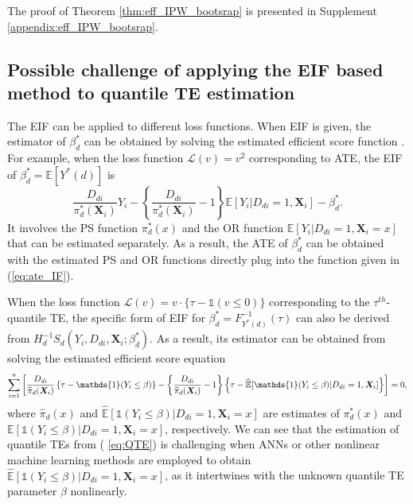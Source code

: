 \documentclass[11pt]{article}
\numberwithin{equation}{section}
\begin{document}
The proof of Theorem \ref{thm:eff_IPW_bootsrap} is presented in Supplement \ref{appendix:eff_IPW_bootsrap}.






\subsection{Possible challenge of applying the EIF based method to quantile TE estimation}\label{sec:EIFestimator}

The EIF can be applied to different loss functions. When EIF is given, the estimator of $\beta
_{d}^{\ast }$ can be obtained by solving the estimated efficient score
function \citep{tsiatis2007semiparametric}. For example, when the loss
function $\mathcal{L}(v)=v^{2}$ corresponding to ATE, the EIF of $\beta
_{d}^{\ast }=\mathbb{E}[Y^{\ast }(d)]$ is
\begin{equation}
\frac{D_{di}}{\pi _{d}^{\ast }(\boldsymbol{X}_{i})}Y_{i}-\left\{ \frac{D_{di}%
}{\pi _{d}^{\ast }(\boldsymbol{X}_{i})}-1\right\} \mathbb{E}[Y_{i}|D_{di}=1,%
\boldsymbol{X}_{i}]-\beta _{d}^{\ast }.  \label{eq:ate_IF}
\end{equation}%
It involves the PS function $\pi _{d}^{\ast }(x)$ and the OR function $%
\mathbb{E}[Y_{i}|D_{di}=1,\boldsymbol{X}_{i}=x]$ that can be estimated separately. As a result, the ATE of $\beta
_{d}^{\ast }$ can be obtained with the estimated PS and OR functions directly plug into the function given in (\ref{eq:ate_IF}).

When the loss function $\mathcal{L}(v)=v\cdot \{\tau -\mathds{1}(v\leq 0)\}$
corresponding to the $\tau ^{th}$-quantile TE, the specific form of EIF for $%
\beta _{d}^{\ast }=F_{Y^{\ast }(d)}^{-1}(\tau )$ can also be derived from $%
H_{d}^{-1}S_{d}(Y_{i},D_{di},\boldsymbol{X}_{i};\beta
_{d}^{\ast })$. As a result, its estimator can be obtained from solving
the estimated efficient score equation%
\begin{equation}
\sum_{i=1}^{n}\left[ \frac{D_{di}}{\widehat{\pi }_{d}(\boldsymbol{X}
_{i})}\left\{ \tau -\mathds{1}(Y_{i}\leq \beta )\right\} -\left\{ \frac{%
D_{di}}{\widehat{\pi }_{d}(\boldsymbol{X}_{i})}-1\right\} \left\{
\tau -\widehat{\mathbb{E}}[\mathds{1}(Y_{i}\leq \beta )|D_{di}=1,\boldsymbol{%
X}_{i}]\right\} \right] =0,  \label{eq:QTE}
\end{equation}%
where  $\widehat{\pi }_{d}(x)$ and $\widehat{\mathbb{E}}[\mathds{1}%
(Y_{i}\leq \beta )|D_{di}=1,\boldsymbol{X}_{i}=x]$ are estimates of {$\pi
_{d}^{\ast }(x)$ and }$\mathbb{E}[\mathds{1}(Y_{i}\leq \beta )|D_{di}=1,%
\boldsymbol{X}_{i}=x]$, respectively. We can see that the estimation of quantile TEs from (%
\ref{eq:QTE}) is challenging when ANNs or other nonlinear machine
learning methods are employed to obtain $\widehat{\mathbb{E}}[\mathds{1}%
(Y_{i}\leq \beta )|D_{di}=1,\boldsymbol{X}_{i}=x]$, as it intertwines with
	the unknown quantile TE parameter $\beta$ nonlinearly.
\end{document}
